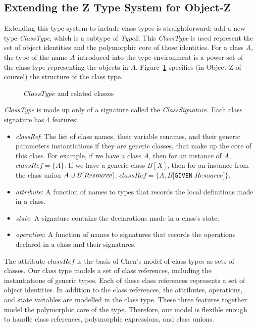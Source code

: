 \subsection{Extending the Z Type System for Object-Z}

Extending this type system to include class types is straightforward:
add a new type {\em ClassType}, which is a subtype of {\em
Type2}. This {\em ClassType} is used represent the set of object
identities and the polymorphic core of those identities. For a class
$A$, the type of the name $A$ introduced into the type environment is
a power set of the class type representing the objects in
$A$. Figure~\ref{ClassType.fig} specifies (in Object-Z of course!)
the structure of the class type.

\begin{figure}[t]
 
\caption{$ClassType$ and related classes}
\label{ClassType.fig}
\end{figure}

\vspace{2mm} {\em ClassType} is made up only of a signature called
the {\em ClassSignature}. Each class signature has 4 features:
\begin{itemize}
  \item {\em classRef}: The list of class names, their variable renames, and
    their generic parameters instantiations if
    they are generic classes, that make up the core of
    this class. For example, if we have a class $A$, then for an
    instance of $A$, $classRef = \{ A \}$. If we have a generic class
    $B[X]$, then for an instance from the class union $A \classuni
    B[Resource]$, $classRef = \{ A, B[${\tt GIVEN} $Resource]\}$.
  \item {\em attribute}: A function of names to types that records
    the local definitions made in a class.
  \item {\em state}: A signature contains the declarations made in a
    class's state.
  \item {\em operation}: A function of names to signatures that
    records the operations declared in a class and their signatures.
\end{itemize}

The attribute $classRef$ is the basis of Chen's model of class types as
sets of classes.  Our class type models a set of class references,
including the instantiations of generic types. Each of these class
references represents a set of object identities. In addition to the
class references, the attributes, operations, and state variables are
modelled in the class type. These three features together model the
polymorphic core of the type. Therefore, our model is flexible enough
to handle class references, polymorphic expressions, and class unions.

